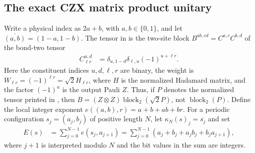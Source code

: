 \subsection{The exact CZX matrix product unitary}

\begin{definition}
    \label{def:mpug_czx_exact_tensor}
    \leanok
    Write a physical index as $2a+b$, with $a,b\in\{0,1\}$, and let
    $\overline{(a,b)}=(1-a,1-b)$. The tensor in
    \cite[lines~4503--4547]{FrancoRubio2025MPUGauging}
    is the two-site block $B^{ab,cd}=C^{a,c}C^{b,d}$ of the bond-two tensor
    \begin{align}
        C^{u,d}_{\ell r}
         & =\delta_{u,1-d}\delta_{\ell,u}(-1)^{u+\ell r}.
    \end{align}
    Here the constituent indices $u,d,\ell,r$ are binary, the weight is
    $W_{\ell r}=(-1)^{\ell r}=\sqrt{2}H_{\ell r}$, where $H$ is the
    normalized Hadamard matrix, and the factor $(-1)^u$ is the output
    Pauli $Z$. Thus, if $P$ denotes the normalized tensor printed in
    \cite[lines~1906--1943]{Cirac2017MPU}, then
    $B=(Z\otimes Z)\operatorname{block}_2(\sqrt{2}P)$, not
    $\operatorname{block}_2(P)$.
    Define the local integer exponent $e((a,b),r)=a+b+ab+br$.
    For a periodic configuration $s_j=(a_j,b_j)$ of positive length $N$,
    let $\kappa_N(s)_j=\overline{s_j}$ and set
    \begin{align}
        E(s) & =\sum_{j=0}^{N-1}e(s_j,a_{j+1})
        =\sum_{j=0}^{N-1}(a_j+b_j+a_jb_j+b_ja_{j+1}),
    \end{align}
    where $j+1$ is interpreted modulo $N$ and the bit values in the sum
    are integers.
\end{definition}

